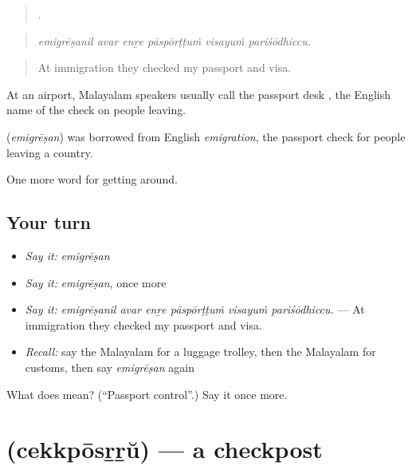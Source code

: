 \begin{quote}
     .
\end{quote}

\begin{quote}
\emph{emigrēṣanil avar enṟe pāspōrṭṭuṁ visayuṁ pariśōdhiccu.}
\end{quote}

\begin{quote}
At immigration they checked my passport and visa.
\end{quote}

At an airport, Malayalam speakers usually call the passport desk , the English name of the check on people leaving.

\begin{cousinweb}
\textbf{} (\emph{emigrēṣan}) was borrowed from English \emph{emigration}, the passport check for people leaving a country.
\end{cousinweb}

\begin{grammarlens}[title={What you've built}]
One more word for getting around.
\end{grammarlens}

\subsection*{Your turn}
\begin{itemize}
\raggedright
  \item \emph{Say it:} \emph{emigrēṣan}
  \item \emph{Say it:} \emph{emigrēṣan}, once more
  \item \emph{Say it:} \emph{emigrēṣanil avar enṟe pāspōrṭṭuṁ visayuṁ pariśōdhiccu.} — At immigration they checked my passport and visa.
  \item \emph{Recall:} say the Malayalam for a luggage trolley, then the Malayalam for customs, then say \emph{emigrēṣan} again
\end{itemize}

\begin{tcolorbox}[breakable,colback=teal!4,colframe=teal!35!black,title={Before you move on}]
What does  mean? (\textquotedblleft{}Passport control\textquotedblright{}.) Say it once more.
\end{tcolorbox}
\section[\texorpdfstring{\ml{ചെക്ക്പോസ്റ്റ്} (cekkpōsṟṟŭ)}{ചെക്ക്പോസ്റ്റ് (cekkpōsṟṟŭ)}]{ (cekkpōsṟṟŭ) — a checkpost}

